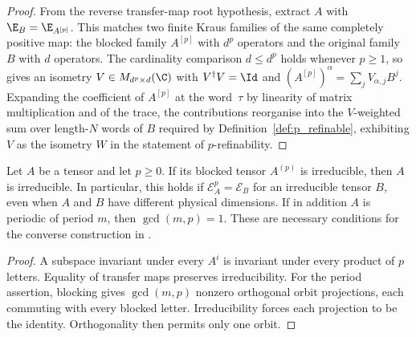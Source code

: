 \begin{proof}\leanok
    From the reverse transfer-map root hypothesis, extract $A$ with
    $\E_B = \E_{A^{[p]}}$. This matches two finite Kraus
    families of the same completely positive map: the blocked family $A^{[p]}$
    with $d^p$ operators and the original family $B$ with $d$ operators.
    The cardinality comparison $d \le d^p$ holds whenever $p \ge 1$, so
    \cite[Theorem~2.1(4)]{Wolf2012Quantum} gives an isometry
    $V \in M_{d^p \times d}(\C)$ with $V^\dagger V = \Id$ and
    $(A^{[p]})^\alpha = \sum_j V_{\alpha,j}B^j$. Expanding the
    coefficient of $A^{[p]}$ at the word~$\tau$ by linearity of matrix
    multiplication and of the trace, the contributions reorganise into the
    $V$-weighted sum over length-$N$ words of $B$ required by
    Definition~\ref{def:p_refinable}, exhibiting $V$ as the isometry $W$ in the
    statement of $p$-refinability.
\end{proof}

\begin{lemma}
    \label{thm:periodic_irreducible_root_constraints}
    \leanok
    Let $A$ be a tensor and let $p\geq0$. If its blocked tensor
    $A^{(p)}$ is irreducible, then $A$ is irreducible. In particular,
    this holds if $\mathcal E_A^p=\mathcal E_B$ for an irreducible
    tensor $B$, even when $A$ and $B$ have different physical dimensions.
    If in addition $A$ is periodic of period $m$, then $\gcd(m,p)=1$.
    These are necessary conditions for the converse construction in
    \cite[Theorem~4.1]{DeLasCuevas2017Irreducible}.
\end{lemma}

\begin{proof}\leanok
    A subspace invariant under every $A^i$ is invariant under every
    product of $p$ letters. Equality of transfer maps preserves
    irreducibility. For the period assertion, blocking gives
    $\gcd(m,p)$ nonzero orthogonal orbit projections, each commuting
    with every blocked letter. Irreducibility forces each projection
    to be the identity. Orthogonality then permits only one orbit.
\end{proof}

